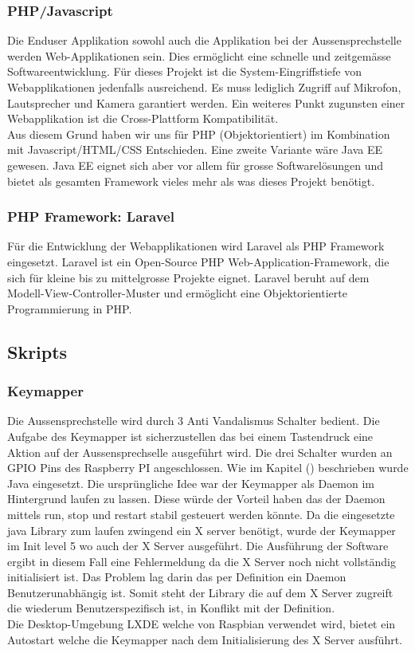 \subsubsection{PHP/Javascript}
Die Enduser Applikation sowohl auch die Applikation bei der Aussensprechstelle werden Web-Applikationen sein. Dies ermöglicht eine schnelle und zeitgemässe Softwareentwicklung. Für dieses Projekt ist die System-Eingriffstiefe von Webapplikationen jedenfalls ausreichend. Es muss lediglich Zugriff auf Mikrofon, Lautsprecher und Kamera garantiert werden. Ein weiteres Punkt zugunsten einer Webapplikation ist die Cross-Plattform Kompatibilität. 
\\
Aus diesem Grund haben wir uns für PHP (Objektorientiert) im Kombination mit Javascript/HTML/CSS Entschieden. Eine zweite Variante wäre Java EE gewesen. Java EE eignet sich aber vor allem für grosse Softwarelösungen und bietet als gesamten Framework vieles mehr als was dieses Projekt benötigt. 
\\
\subsubsection{PHP Framework: Laravel}
Für die Entwicklung der Webapplikationen wird Laravel als PHP Framework eingesetzt. Laravel ist ein Open-Source PHP Web-Application-Framework, die sich für kleine bis zu mittelgrosse Projekte eignet. Laravel beruht auf dem Modell-View-Controller-Muster und ermöglicht eine Objektorientierte Programmierung in PHP.

\subsection{Skripts}

\subsubsection{Keymapper}
Die Aussensprechstelle wird durch 3 Anti Vandalismus Schalter bedient. Die Aufgabe des Keymapper ist sicherzustellen das bei einem Tastendruck eine Aktion auf der Aussensprechselle ausgeführt wird. Die drei Schalter wurden an GPIO Pins des Raspberry PI angeschlossen. Wie im Kapitel ()
beschrieben wurde Java eingesetzt. Die ursprüngliche Idee war der Keymapper als Daemon im Hintergrund laufen zu lassen. Diese würde der Vorteil haben das der Daemon mittels run, stop und restart stabil gesteuert werden könnte. Da die eingesetzte java Library zum laufen zwingend ein X server benötigt, wurde der Keymapper im Init level 5 wo auch der X Server ausgeführt. Die Ausführung der Software ergibt in diesem Fall eine Fehlermeldung da die X Server noch nicht vollständig initialisiert ist. 
Das Problem lag darin das per Definition ein Daemon Benutzerunabhängig ist. Somit steht der Library die auf dem X Server zugreift die wiederum Benutzerspezifisch ist, in Konflikt mit der Definition. 
\\
Die Desktop-Umgebung LXDE welche von Raspbian verwendet wird, bietet ein Autostart welche die Keymapper nach dem Initialisierung des X Server ausführt.

